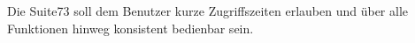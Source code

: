 Die Suite73 soll dem Benutzer kurze Zugriffszeiten erlauben und über alle Funktionen hinweg konsistent bedienbar sein.